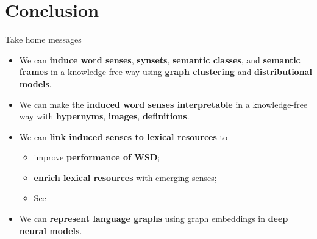 
\section{Conclusion}

%
%
%

\begin{frame}{Take home messages}

\begin{itemize}
	\item We can \alert{\textbf{induce word senses}}, \alert{\textbf{synsets}}, \alert{\textbf{semantic classes}}, and \textbf{\alert{semantic frames}} in a knowledge-free way using \textbf{graph clustering} and \textbf{distributional models}.
    \vspace{1em}
    \pause
    
	\item We can make the \alert{\textbf{induced word senses interpretable}} in a knowledge-free way with \textbf{hypernyms}, \textbf{images},  \textbf{definitions}. 
	\vspace{1em}
    \pause
	
	\item We can \alert{\textbf{link induced senses to lexical resources}} to
	\begin{itemize} 
		\item improve \textbf{performance of WSD};
		\item \textbf{enrich lexical resources} with emerging senses;
		\item See~\cite{panchenko2016best,faralli2016linked,panchenko-EtAl:2017:SENSE2017,biemann2018framework}
	\end{itemize}
	
	\pause 
	\item We can \textbf{\alert{represent language graphs}} using graph embeddings in \textbf{deep neural models}.
	
\end{itemize}


\end{frame}

%
%
%
%
%	
%	


